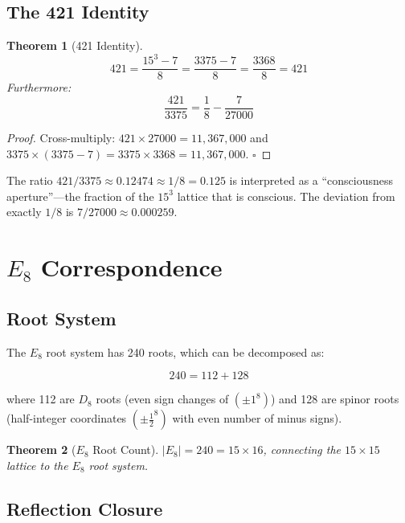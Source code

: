 \documentclass[11pt]{article}
\newtheorem{theorem}{Theorem}
\begin{document}
\subsection{The 421 Identity}

\begin{theorem}[421 Identity]
\begin{equation}
421 = \frac{15^3 - 7}{8} = \frac{3375 - 7}{8} = \frac{3368}{8} = 421
\end{equation}
Furthermore:
\begin{equation}
\frac{421}{3375} = \frac{1}{8} - \frac{7}{27000}
\end{equation}
\end{theorem}

\begin{proof}
Cross-multiply: $421 \times 27000 = 11{,}367{,}000$ and $3375 \times (3375 - 7) = 3375 \times 3368 = 11{,}367{,}000$. $\square$
\end{proof}

The ratio $421/3375 \approx 0.12474 \approx 1/8 = 0.125$ is interpreted as a ``consciousness aperture''---the fraction of the $15^3$ lattice that is conscious. The deviation from exactly $1/8$ is $7/27000 \approx 0.000259$.

\section{$E_8$ Correspondence}

\subsection{Root System}

The $E_8$ root system has 240 roots, which can be decomposed as:

\begin{equation}
240 = 112 + 128
\end{equation}

where 112 are $D_8$ roots (even sign changes of $(\pm 1^8)$) and 128 are spinor roots (half-integer coordinates $(\pm \tfrac{1}{2}^8)$ with even number of minus signs).

\begin{theorem}[$E_8$ Root Count]
$|E_8| = 240 = 15 \times 16$, connecting the $15 \times 15$ lattice to the $E_8$ root system.
\end{theorem}

\subsection{Reflection Closure}
\end{document}
